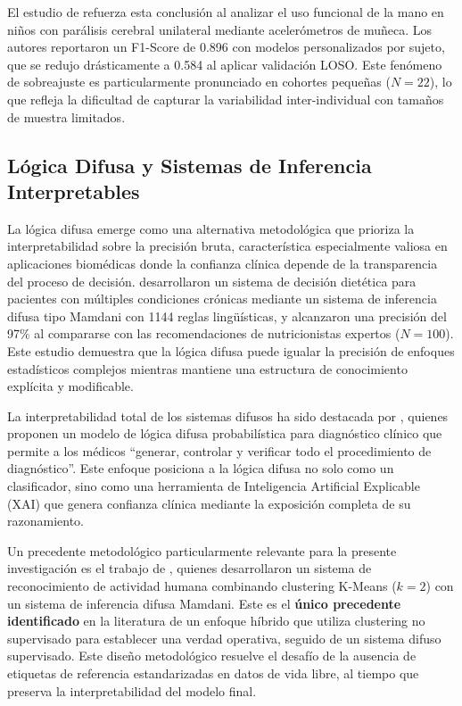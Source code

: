 El estudio de \cite{Mathew2024LOSO} refuerza esta conclusión al analizar el uso funcional de la mano en niños con parálisis cerebral unilateral mediante acelerómetros de muñeca. Los autores reportaron un F1-Score de 0.896 con modelos personalizados por sujeto, que se redujo drásticamente a 0.584 al aplicar validación LOSO. Este fenómeno de sobreajuste es particularmente pronunciado en cohortes pequeñas ($N=22$), lo que refleja la dificultad de capturar la variabilidad inter-individual con tamaños de muestra limitados.

\subsection{Lógica Difusa y Sistemas de Inferencia Interpretables}
\label{subsec:fuzzy_logic}

La lógica difusa emerge como una alternativa metodológica que prioriza la interpretabilidad sobre la precisión bruta, característica especialmente valiosa en aplicaciones biomédicas donde la confianza clínica depende de la transparencia del proceso de decisión. \cite{MarashiHosseini2023Dietary} desarrollaron un sistema de decisión dietética para pacientes con múltiples condiciones crónicas mediante un sistema de inferencia difusa tipo Mamdani con 1144 reglas lingüísticas, y alcanzaron una precisión del 97\% al compararse con las recomendaciones de nutricionistas expertos ($N=100$). Este estudio demuestra que la lógica difusa puede igualar la precisión de enfoques estadísticos complejos mientras mantiene una estructura de conocimiento explícita y modificable.

La interpretabilidad total de los sistemas difusos ha sido destacada por \cite{Capitoli2025FuzzyXAI}, quienes proponen un modelo de lógica difusa probabilística para diagnóstico clínico que permite a los médicos ``generar, controlar y verificar todo el procedimiento de diagnóstico''. Este enfoque posiciona a la lógica difusa no solo como un clasificador, sino como una herramienta de Inteligencia Artificial Explicable (XAI) que genera confianza clínica mediante la exposición completa de su razonamiento.

Un precedente metodológico particularmente relevante para la presente investigación es el trabajo de \cite{Goncalves2021}, quienes desarrollaron un sistema de reconocimiento de actividad humana combinando clustering K-Means ($k=2$) con un sistema de inferencia difusa Mamdani. Este es el \textbf{único precedente identificado} en la literatura de un enfoque híbrido que utiliza clustering no supervisado para establecer una verdad operativa, seguido de un sistema difuso supervisado. Este diseño metodológico resuelve el desafío de la ausencia de etiquetas de referencia estandarizadas en datos de vida libre, al tiempo que preserva la interpretabilidad del modelo final.

